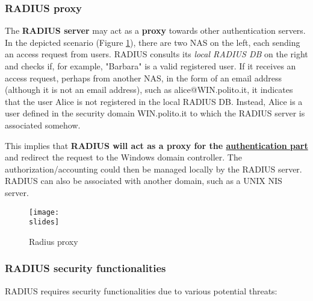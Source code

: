 \subsubsection{RADIUS proxy}
The \textbf{RADIUS server} may act as a \textbf{proxy} towards other authentication servers. In the depicted scenario (Figure \ref{fig:radius-proxy}), there are two NAS on the left, each sending an access request from users. RADIUS consults its \textit{local RADIUS DB} on the right and checks if, for example, "Barbara" is a valid registered user. If it receives an access request, perhaps from another NAS, in the form of an email address (although it is not an email address), such as alice@WIN.polito.it, it indicates that the user Alice is not registered in the local RADIUS DB. Instead, Alice is a user defined in the security domain WIN.polito.it to which the RADIUS server is associated somehow.

This implies that \textbf{RADIUS will act as a proxy for the \underline{authentication part}} and redirect the request to the Windows domain controller. The authorization/accounting could then be managed locally by the RADIUS server. RADIUS can also be associated with another domain, such as a UNIX NIS server.

\begin{figure}[h]
    \centering
    \texttt{[image: \\slides]}
    \caption{Radius proxy}
    \label{fig:radius-proxy}
\end{figure}


\subsubsection{RADIUS security functionalities}
RADIUS requires security functionalities due to various potential threats:

